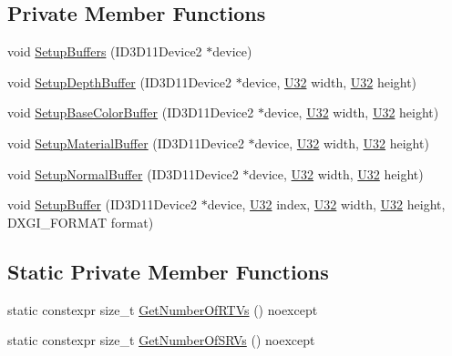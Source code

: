 \subsection*{Private Member Functions}
\begin{DoxyCompactItemize}
\item 
void \hyperlink{structmage_1_1_g_buffer_a5b0d4c4b0e29afad8524d11f66a5ff3d}{Setup\+Buffers} (I\+D3\+D11\+Device2 $\ast$device)
\item 
void \hyperlink{structmage_1_1_g_buffer_a37217bae0d08d050223d2e0d318580aa}{Setup\+Depth\+Buffer} (I\+D3\+D11\+Device2 $\ast$device, \hyperlink{namespacemage_a41c104c036fba3756a74e19f793eeaa1}{U32} width, \hyperlink{namespacemage_a41c104c036fba3756a74e19f793eeaa1}{U32} height)
\item 
void \hyperlink{structmage_1_1_g_buffer_a33402870130bb9b73e5a62b22d255a61}{Setup\+Base\+Color\+Buffer} (I\+D3\+D11\+Device2 $\ast$device, \hyperlink{namespacemage_a41c104c036fba3756a74e19f793eeaa1}{U32} width, \hyperlink{namespacemage_a41c104c036fba3756a74e19f793eeaa1}{U32} height)
\item 
void \hyperlink{structmage_1_1_g_buffer_ae0cd8580302b590e0f0c8e4cb70e1d89}{Setup\+Material\+Buffer} (I\+D3\+D11\+Device2 $\ast$device, \hyperlink{namespacemage_a41c104c036fba3756a74e19f793eeaa1}{U32} width, \hyperlink{namespacemage_a41c104c036fba3756a74e19f793eeaa1}{U32} height)
\item 
void \hyperlink{structmage_1_1_g_buffer_a6a4b6b500f3fa6255d094389e4893427}{Setup\+Normal\+Buffer} (I\+D3\+D11\+Device2 $\ast$device, \hyperlink{namespacemage_a41c104c036fba3756a74e19f793eeaa1}{U32} width, \hyperlink{namespacemage_a41c104c036fba3756a74e19f793eeaa1}{U32} height)
\item 
void \hyperlink{structmage_1_1_g_buffer_a3d5b181c9f515283548f482e70b5984f}{Setup\+Buffer} (I\+D3\+D11\+Device2 $\ast$device, \hyperlink{namespacemage_a41c104c036fba3756a74e19f793eeaa1}{U32} index, \hyperlink{namespacemage_a41c104c036fba3756a74e19f793eeaa1}{U32} width, \hyperlink{namespacemage_a41c104c036fba3756a74e19f793eeaa1}{U32} height, D\+X\+G\+I\+\_\+\+F\+O\+R\+M\+AT format)
\end{DoxyCompactItemize}
\subsection*{Static Private Member Functions}
\begin{DoxyCompactItemize}
\item 
static constexpr size\+\_\+t \hyperlink{structmage_1_1_g_buffer_a732cac527995dda5a9b19991fd23e0cf}{Get\+Number\+Of\+R\+T\+Vs} () noexcept
\item 
static constexpr size\+\_\+t \hyperlink{structmage_1_1_g_buffer_ae7966e3c50ecf69c153e05b01da7456e}{Get\+Number\+Of\+S\+R\+Vs} () noexcept
\end{DoxyCompactItemize}
